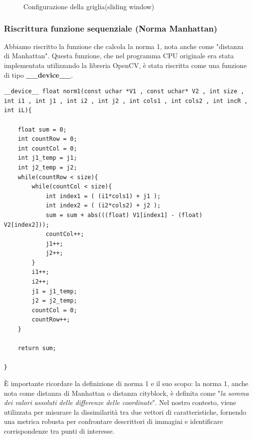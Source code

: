 \documentclass[12pt,a4paper]{report}
\begin{document}
\begin{figure}[H]
    \centering
    \caption{Configurazione della griglia(sliding window) }
\end{figure}

\newpage
\subsubsection{Riscrittura funzione sequenziale (Norma Manhattan)}

Abbiamo riscritto la funzione che calcola la norma 1, nota anche come "distanza di Manhattan". Questa funzione, che nel programma CPU originale era stata implementata utilizzando la libreria OpenCV, è stata riscritta come una funzione di tipo \textbf{\_\_device\_\_}.

\begin{lstlisting}
__device__ float norm1(const uchar *V1 , const uchar* V2 , int size , int i1 , int j1 , int i2 , int j2 , int cols1 , int cols2 , int incR , int iL){

    float sum = 0;
    int countRow = 0;
    int countCol = 0;
    int j1_temp = j1;
    int j2_temp = j2;
    while(countRow < size){
        while(countCol < size){
            int index1 = ( (i1*cols1) + j1 );
            int index2 = ( (i2*cols2) + j2 );
            sum = sum + abs(((float) V1[index1] - (float) V2[index2]));
            countCol++;
            j1++;
            j2++;
        }
        i1++;
        i2++;
        j1 = j1_temp;
        j2 = j2_temp;
        countCol = 0;
        countRow++;
    }

    return sum;
    
}
\end{lstlisting}

\vspace{1cm}

È importante ricordare la definizione di norma 1 e il suo scopo: la norma 1, anche nota come distanza di Manhattan o distanza cityblock, è definita come "\textit{la somma dei valori assoluti delle differenze delle coordinate}". Nel nostro contesto, viene utilizzata per misurare la dissimilarità tra due vettori di caratteristiche, fornendo una metrica robusta per confrontare descrittori di immagini e identificare corrispondenze tra punti di interesse.
\end{document}
